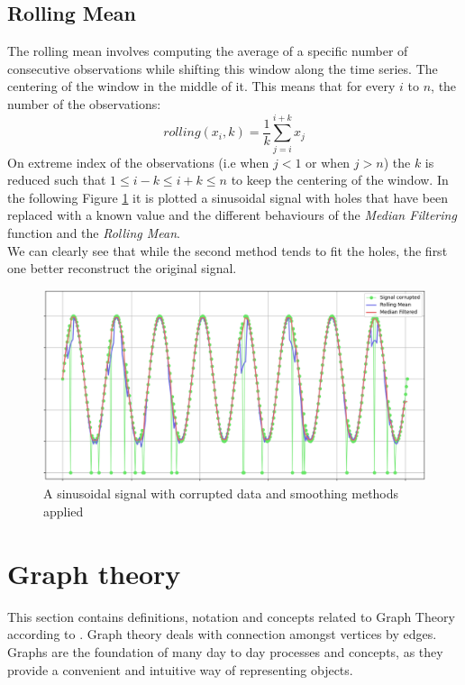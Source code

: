 \subsection{Rolling Mean}
The rolling mean involves computing the average of a specific number of consecutive observations while shifting this window along the time series.
The centering of the window in the middle of it.
This means that for every $i$ to $n$, the number of the observations:
\begin{equation}
  rolling(x_i,k) = \frac{1}{k} \sum_{j=i}^{i+k} x_j
\end{equation}
On extreme index of the observations (i.e when $j < 1$ or when $j > n$) the $k$ is reduced such that $1 \leq i-k \leq i+k \leq n$ to keep the centering of the window.
In the following Figure \ref{fig:sin_corrupted_smoothed} it is plotted a sinusoidal signal with holes that have been replaced with a known value and the different behaviours of the \textit{Median Filtering} function and the \textit{Rolling Mean}. \\
We can clearly see that while the second method tends to fit the holes, the first one better reconstruct the original signal.
\begin{figure}[H]
  \centering  
    \includegraphics[width=\linewidth]{graphics/mean_median_filter.png}
    \caption{A sinusoidal signal with corrupted data and smoothing methods applied}
    \label{fig:sin_corrupted_smoothed}
\end{figure}


\section{Graph theory}
This section contains definitions, notation and concepts related to Graph Theory according
to \cite{graph_theory:2010}.
Graph theory deals with connection amongst vertices by edges.
Graphs are the foundation of many day to day processes and concepts, as they provide a convenient
and intuitive way of representing objects.

